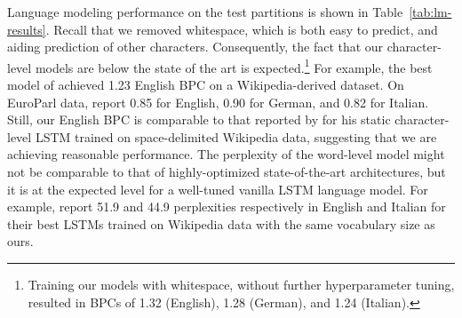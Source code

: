 Language modeling performance on the test partitions is shown in
Table~\ref{tab:lm-results}. Recall that we removed whitespace, which
is both easy to predict, and aiding prediction of other
characters. Consequently, the fact that our character-level models are
below the state of the art is expected.\footnote{Training our models
  with whitespace, without further hyperparameter tuning, resulted in
  BPCs of 1.32 (English), 1.28 (German), and 1.24 (Italian).}
For example, the best model of  achieved
1.23 English BPC on a Wikipedia-derived dataset. %
On EuroParl data,  report 0.85 for English,
0.90 for German, and 0.82 for Italian. Still, our English BPC is
comparable to that reported by  for his static
character-level LSTM trained on space-delimited Wikipedia data,
suggesting that we are achieving reasonable performance.
The perplexity of the word-level model might not be comparable to
that of highly-optimized state-of-the-art architectures, but it is at the
expected level for a well-tuned vanilla LSTM language model. For
example,  report 51.9 and 44.9 perplexities respectively in English and Italian for
their best LSTMs trained on Wikipedia data with the same vocabulary
size as ours.

